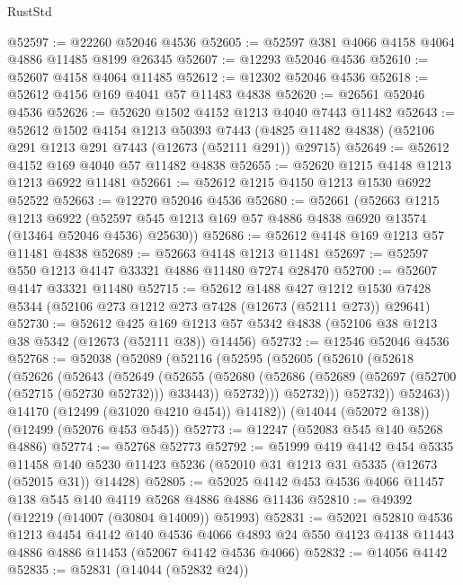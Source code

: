 \begin{lexlean}{RustStd}
\begin{coremodule}
@52597 := @22260 @52046 @4536
@52605 := @52597 @381 @4066 @4158 @4064 @4886 @11485 @8199 @26345
@52607 := @12293 @52046 @4536
@52610 := @52607 @4158 @4064 @11485
@52612 := @12302 @52046 @4536
@52618 := @52612 @4156 @169 @4041 @57 @11483 @4838
@52620 := @26561 @52046 @4536
@52626 := @52620 @1502 @4152 @1213 @4040 @7443 @11482
@52643 := @52612
    @1502
    @4154
    @1213
    @50393
    @7443
    (@4825 @11482 @4838)
    (@52106 @291 @1213 @291 @7443 (@12673 (@52111 @291)) @29715)
@52649 := @52612 @4152 @169 @4040 @57 @11482 @4838
@52655 := @52620 @1215 @4148 @1213 @1213 @6922 @11481
@52661 := @52612 @1215 @4150 @1213 @1530 @6922 @52522
@52663 := @12270 @52046 @4536
@52680 := @52661
    (@52663
      @1215
      @1213
      @6922
      (@52597 @545 @1213 @169 @57 @4886 @4838 @6920 @13574 (@13464 @52046 @4536) @25630))
@52686 := @52612 @4148 @169 @1213 @57 @11481 @4838
@52689 := @52663 @4148 @1213 @11481
@52697 := @52597 @550 @1213 @4147 @33321 @4886 @11480 @7274 @28470
@52700 := @52607 @4147 @33321 @11480
@52715 := @52612
    @1488
    @427
    @1212
    @1530
    @7428
    @5344
    (@52106 @273 @1212 @273 @7428 (@12673 (@52111 @273)) @29641)
@52730 := @52612
    @425
    @169
    @1213
    @57
    @5342
    @4838
    (@52106 @38 @1213 @38 @5342 (@12673 (@52111 @38)) @14456)
@52732 := @12546 @52046 @4536
@52768 := @52038
    (@52089
      (@52116
        (@52595
          (@52605
            (@52610
              (@52618
                (@52626
                  (@52643
                    (@52649
                      (@52655
                        (@52680
                          (@52686
                            (@52689 (@52697 (@52700 (@52715 (@52730 @52732))) @33443))
                            @52732)))
                      @52732)))
                @52732))
            @52463))
        @14170
        (@12499 (@31020 @4210 @454))
        @14182))
    (@14044 (@52072 @138))
    (@12499 (@52076 @453 @545))
@52773 := @12247 (@52083 @545 @140 @5268 @4886)
@52774 := @52768 @52773
@52792 := @51999
    @419
    @4142
    @454
    @5335
    @11458
    @140
    @5230
    @11423
    @5236
    (@52010 @31 @1213 @31 @5335 (@12673 (@52015 @31)) @14428)
@52805 := @52025 @4142 @453 @4536 @4066 @11457 @138 @545 @140 @4119 @5268 @4886 @4886 @11436
@52810 := @49392 (@12219 (@14007 (@30804 @14009)) @51993)
@52831 := @52021
    @52810
    @4536
    @1213
    @4454
    @4142
    @140
    @4536
    @4066
    @4893
    @24
    @550
    @4123
    @4138
    @11443
    @4886
    @4886
    @11453
    (@52067 @4142 @4536 @4066)
@52832 := @14056 @4142
@52835 := @52831 (@14044 (@52832 @24))

\end{coremodule}
\end{lexlean}
